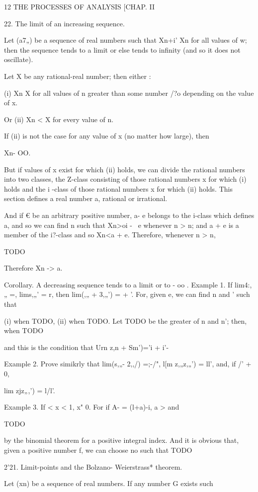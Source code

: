 12 THE PROCESSES OF ANALYSIS [CHAP. II

22. The limit of an increasing sequence.

Let (a7„) be a sequence of real numbers such that Xn+i' Xn for all
values of w; then the sequence tends to a limit or else tends to
infinity (and so it does not oscillate).

Let X be any rational-real number; then either :

(i) Xn X for all values of n greater than some number /?o depending on
the value of x.

Or (ii) Xn < X for every value of n.

If (ii) is not the case for any value of x (no matter how large), then

Xn- OO.

But if values of x exist for which (ii) holds, we can divide the
rational numbers into two classes, the Z-class consisting of those
rational numbers x for which (i) holds and the i -class of those
rational numbers x for which (ii) holds. This section defines a real
number a, rational or irrational.

And if € be an arbitrary positive number, a- e belongs to the i-class
which defines a, and so we can find n such that Xn>oi - \ e whenever n
> n; and a + e is a member of the i?-class and so Xn<a + e.
Therefore, whenever n > n,

TODO

Therefore Xn -> a.

Corollary. A decreasing sequence tends to a limit or to - oo . Example
1. If lim4:,„ =, lims,„' = r, then lim(,„ + 3,„') = + '. For, given
e, we can find n and ' such that

(i) when TODO, (ii) when TODO. Let TODO be the greater of n and n';
then, when TODO

and this is the condition that Urn z,n + Sm')='i + i'-

Example 2. Prove simikrly that lim(s,„- 2,,/) =;-/", l[m z,„z,„') =
ll', and, if /' + 0,

lim zjz„,') = l/l'.

Example 3. If < x < 1, x" 0. For if A- = (l+a)-i, a > and

TODO

by the binomial theorem for a positive integral index. And it is
obvious that, given a positive number f, we can choose no such that
TODO

2'21. Limit-points and the Bolzano- Weierstrass* theorem.

Let (xn) be a sequence of real numbers. If any number G exists such

